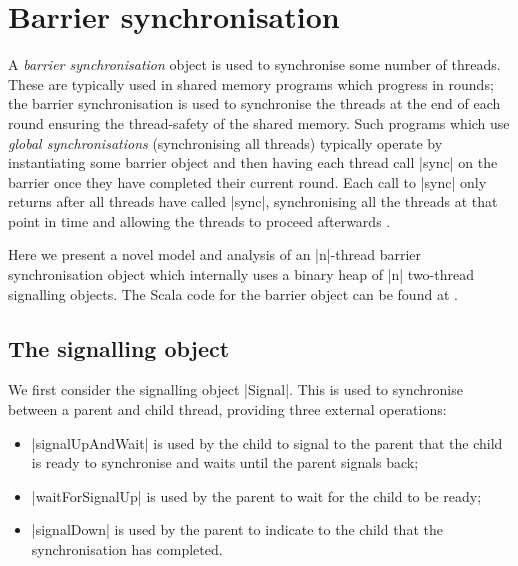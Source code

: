 \newpage
\section{Barrier synchronisation}
\inlineScala

A \emph{barrier synchronisation} object is used to synchronise some number of threads.
These are typically used in shared memory programs which progress in rounds; the barrier synchronisation is used to synchronise the threads at the end of each round ensuring the thread-safety of the shared memory. Such programs which use \emph{global synchronisations} (synchronising all threads) typically operate by instantiating some barrier object and then having each thread call |sync| on the barrier once they have completed their current round. Each call to |sync| only returns after all threads have called |sync|, synchronising all the threads at that point in time and allowing the threads to proceed afterwards \cite{CP}.



Here we present a novel model and analysis of an |n|-thread barrier synchronisation object which internally uses a binary heap of |n| two-thread signalling objects. The Scala code for the barrier object can be found at \cite{LoweBarrier}.

\subsection{The signalling object}

We first consider the signalling object |Signal|. This is used to synchronise between a parent and child thread, providing three external operations:

\begin{itemize}
  \item |signalUpAndWait| is used by the child to signal to the parent that the child is ready to synchronise and waits until the parent signals back;
  \item |waitForSignalUp| is used by the parent to wait for the child to be ready;
  \item |signalDown| is used by the parent to indicate to the child that the synchronisation has completed.
\end{itemize}

